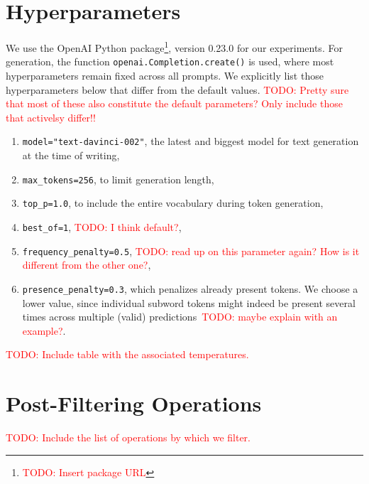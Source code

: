 \documentclass[11pt]{article}
\newcommand{\todo}[1]{\textcolor{red}{TODO: #1}}
\begin{document}
\section{Hyperparameters}
We use the OpenAI Python package\footnote{\todo{Insert package URL}}, version 0.23.0 for our experiments. For generation, the function \texttt{openai.Completion.create()} is used, where most hyperparameters remain fixed across all prompts. We explicitly list those hyperparameters below that differ from the default values.
\todo{Pretty sure that most of these also constitute the default parameters? Only include those that activelsy differ!!}
\begin{enumerate}
	\item \texttt{model="text-davinci-002"}, the latest and biggest model for text generation at the time of writing,
	\item \texttt{max\_tokens=256}, to limit generation length,
	\item \texttt{top\_p=1.0}, to include the entire vocabulary during token generation,
	\item \texttt{best\_of=1}, \todo{I think default?},
	\item \texttt{frequency\_penalty=0.5}, \todo{read up on this parameter again? How is it different from the other one?},
	\item \texttt{presence\_penalty=0.3}, which penalizes already present tokens. We choose a lower value, since individual subword tokens might indeed be present several times across multiple (valid) predictions~\todo{maybe explain with an example?}.
\end{enumerate}

\todo{Include table with the associated temperatures.}


\section{Post-Filtering Operations}
\label{sec:filters}
\todo{Include the list of operations by which we filter.}
\end{document}
